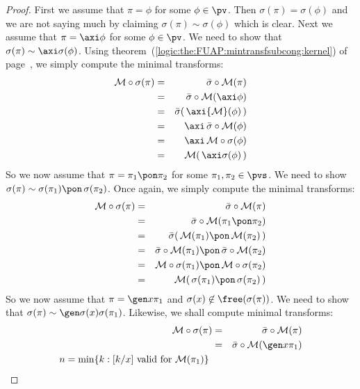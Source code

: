 \begin{proof}
First we assume that $\pi=\phi$ for some $\phi\in\pv$. Then
$\sigma(\pi)=\sigma(\phi)$ and we are not saying much by claiming
$\sigma(\pi)\sim\sigma(\phi)$ which is clear. Next we assume that
$\pi=\axi\phi$ for some $\phi\in\pv$. We need to show that
$\sigma(\pi)\sim\axi\sigma(\phi)$. Using
theorem~(\ref{logic:the:FUAP:mintransfsubcong:kernel}) of
page~\pageref{logic:the:FUAP:mintransfsubcong:kernel}, we simply
compute the minimal transforms:
    \begin{eqnarray*}
    {\cal M}\circ\sigma(\pi)&=&\bar{\sigma}\circ{\cal M}(\pi)\\
    &=&\bar{\sigma}\circ{\cal M}(\axi\phi)\\
    &=&\bar{\sigma}(\,\axi{\cal M}(\phi)\,)\\
    &=&\axi\,\bar{\sigma}\circ{\cal M}(\phi)\\
    &=&\axi\,{\cal M}\circ\sigma(\phi)\\
    &=&{\cal M}(\,\axi\sigma(\phi)\,)\\
    \end{eqnarray*}
So we now assume that $\pi=\pi_{1}\pon\pi_{2}$ for some
$\pi_{1},\pi_{2}\in\pvs$. We need to show
$\sigma(\pi)\sim\sigma(\pi_{1})\pon\,\sigma(\pi_{2})$. Once again,
we simply compute the minimal transforms:
    \begin{eqnarray*}
    {\cal M}\circ\sigma(\pi)&=&\bar{\sigma}\circ{\cal M}(\pi)\\
    &=&\bar{\sigma}\circ{\cal M}(\pi_{1}\pon\pi_{2})\\
    &=&\bar{\sigma}(\,{\cal M}(\pi_{1})\pon\,{\cal M}(\pi_{2})\,)\\
    &=&\bar{\sigma}\circ{\cal M}(\pi_{1})\pon\,\bar{\sigma}\circ{\cal M}(\pi_{2})\\
    &=&{\cal M}\circ\sigma(\pi_{1})\pon\,{\cal M}\circ\sigma(\pi_{2})\\
    &=&{\cal M}(\,\sigma(\pi_{1})\pon\,\sigma(\pi_{2})\,)\\
    \end{eqnarray*}
So we now assume that $\pi=\gen x\pi_{1}$ and
$\sigma(x)\not\in\free(\sigma(\pi))$. We need to show that
$\sigma(\pi)\sim\gen\sigma(x)\sigma(\pi_{1})$. Likewise, we shall
compute minimal transforms:
    \begin{eqnarray*}
    {\cal M}\circ\sigma(\pi)&=&\bar{\sigma}\circ{\cal M}(\pi)\\
    &=&\bar{\sigma}\circ{\cal M}(\gen x\pi_{1})\\
    \mbox{$n=\min\{k:[k/x]\mbox{ valid for }{\cal M}(\pi_{1})\}$}\

\end{eqnarray*}
\end{proof}
